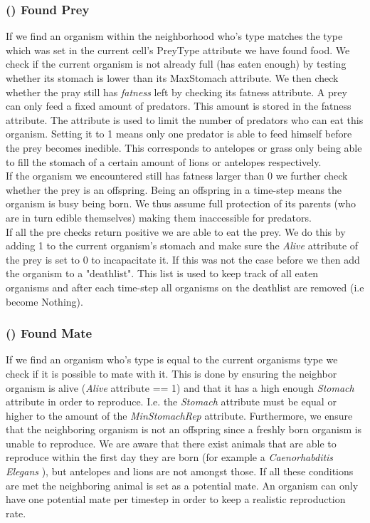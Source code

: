 \documentclass[11pt]{article}
\begin{document}
\subsubsection{() Found Prey}
If we find an organism within the neighborhood who's type matches the type which was set in the current cell's PreyType attribute we have found food. We check if the current organism is not already full (has eaten enough) by testing whether its stomach is lower than its MaxStomach attribute. We then check whether the pray still has {\it fatness} left by checking its fatness attribute. A prey can only feed a fixed amount of predators. This amount is stored in the fatness attribute. The attribute is used to limit the number of predators who can eat this organism. Setting it to 1 means only one predator is able to feed himself before the prey becomes inedible. This corresponds to antelopes or grass only being able to fill the stomach of a certain amount of lions or antelopes respectively.\\
If the organism we encountered still has fatness larger than 0 we further check whether the prey is an offspring. Being an offspring in a time-step means the organism is busy being born. We thus assume full protection of its parents (who are in turn edible themselves) making them inaccessible for predators.\\
If all the pre checks return positive we are able to eat the prey. We do this by adding 1 to the current organism's stomach and make sure the {\it Alive} attribute of the prey is set to 0 to incapacitate it. If this was not the case before we then add the organism to a "deathlist". This list is used to keep track of all eaten organisms and after each time-step all organisms on the deathlist are removed (i.e become Nothing). 

\addtocounter{protocolCounter}{1}
\subsubsection{() Found Mate}
If we find an organism who's type is equal to the current organisms type we check if it is possible to mate with it. This is done by ensuring the neighbor organism is alive ({\it Alive} attribute == 1) and that it has a high enough {\it Stomach} attribute in order to reproduce. I.e. the {\it Stomach} attribute must be equal or higher to the amount of the {\it MinStomachRep} attribute. Furthermore, we ensure that the neighboring organism is not an offspring since a freshly born organism is unable to reproduce. We are aware that there exist animals that are able to reproduce within the first day they are born (for example a {\it Caenorhabditis Elegans} \cite{caenorhabditisElegans}), but antelopes and lions are not amongst those. If all these conditions are met the neighboring animal is set as a potential mate. An organism can only have one potential mate per timestep in order to keep a realistic reproduction rate.
\end{document}
